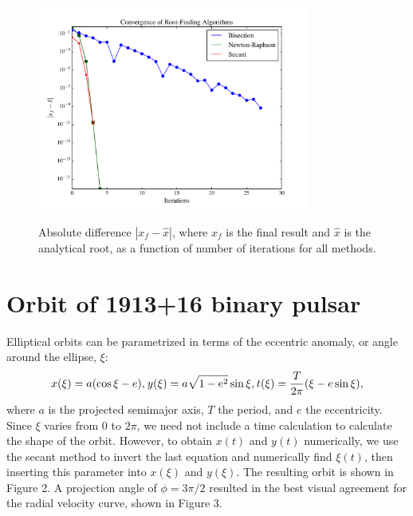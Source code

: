 \documentclass{article}
\begin{document}
\begin{figure}[ht!]\centering
    \includegraphics[width=0.8\textwidth]{convergence.pdf}
    \label{convergence}
    \caption{Absolute difference $|x_f - \hat x|$,
        where $x_f$ is the final result and $\hat x$ is the analytical root,
    as a function of number of iterations for all methods.}
\end{figure}

\section{Orbit of 1913+16 binary pulsar}

Elliptical orbits can be parametrized in terms of the eccentric anomaly,
or angle around the ellipse, $\xi$:
\begin{align}
    x(\xi) = a(\cos\xi - e),
    \sp{}
    y(\xi) = a \sqrt{1 - e^2} \sin\xi,
    \sp{}
    t(\xi) = {T \over 2\pi} (\xi - e \sin\xi),
\end{align}
where $a$ is the projected semimajor axis, $T$ the period, and $e$
the eccentricity.
Since $\xi$ varies from $0$ to $2\pi$, we need not include a time calculation
to calculate the shape of the orbit. However, to obtain $x(t)$ and $y(t)$
numerically, we use the secant method to invert the last equation and
numerically find $\xi(t)$, then inserting this parameter into $x(\xi)$
and $y(\xi)$. The resulting orbit is shown in Figure 2. A projection angle
of $\phi = 3\pi / 2$ resulted in the best visual agreement for the
radial velocity curve, shown in Figure 3.
\end{document}
